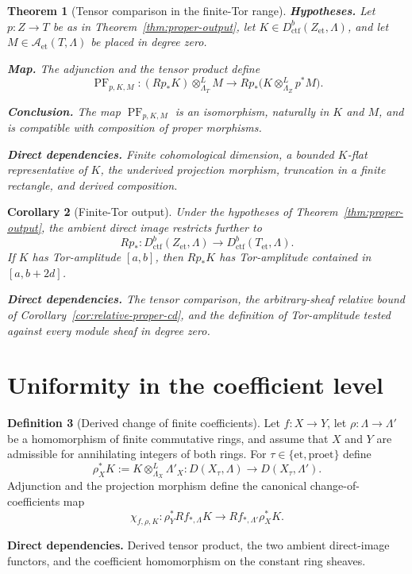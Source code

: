\documentclass[10pt]{article}
\newtheorem{theorem}{Theorem}[section]
\newtheorem{corollary}[theorem]{Corollary}
\theoremstyle{definition}
\newtheorem{definition}[theorem]{Definition}
\newcommand{\Dctf}{D^b_{\mathrm{ctf}}}
\newcommand{\deps}[1]{\par\smallskip\noindent\textbf{Direct dependencies.} #1}
\begin{document}
\begin{theorem}[Tensor comparison in the finite-Tor range]
\label{thm:tensor-comparison}
\textbf{Hypotheses.} Let $p:Z\to T$ be as in
Theorem~\ref{thm:proper-output}, let
$K\in\Dctf(Z_{\mathrm{et}},\Lambda)$, and let
$M\in\mathcal A_{\mathrm{et}}(T,\Lambda)$ be placed in degree zero.

\textbf{Map.} The adjunction and the tensor product define
\[
 \operatorname{PF}_{p,K,M}:
 (Rp_*K)\otimes^L_{\Lambda_T}M
 \longrightarrow
 Rp_*\bigl(K\otimes^L_{\Lambda_Z}p^*M\bigr).
\]

\textbf{Conclusion.} The map $\operatorname{PF}_{p,K,M}$ is an isomorphism,
naturally in $K$ and $M$, and is compatible with composition of proper
morphisms.
\deps{Finite cohomological dimension, a bounded $K$-flat representative of
$K$, the underived projection morphism, truncation in a finite rectangle,
and derived composition.}
\end{theorem}

\begin{corollary}[Finite-Tor output]
\label{cor:ctf-output}
Under the hypotheses of Theorem~\ref{thm:proper-output}, the ambient direct
image restricts further to
\[
 Rp_*:\Dctf(Z_{\mathrm{et}},\Lambda)\longrightarrow
       \Dctf(T_{\mathrm{et}},\Lambda).
\]
If $K$ has Tor-amplitude $[a,b]$, then $Rp_*K$ has Tor-amplitude contained
in $[a,b+2d]$.
\deps{The tensor comparison, the arbitrary-sheaf relative bound of
Corollary~\ref{cor:relative-proper-cd}, and the definition of Tor-amplitude
tested against every module sheaf in degree zero.}
\end{corollary}

\section{Uniformity in the coefficient level}

\begin{definition}[Derived change of finite coefficients]
\label{def:coefficient-change}
Let $f:X\to Y$, let $\rho:\Lambda\to\Lambda'$ be a homomorphism of finite
commutative rings, and assume that $X$ and $Y$ are admissible for annihilating
integers of both rings.  For $\tau\in\{\mathrm{et},\mathrm{proet}\}$ define
\[
 \rho_X^*K:=K\otimes^L_{\Lambda_X}\Lambda'_X:
 D(X_\tau,\Lambda)\longrightarrow D(X_\tau,\Lambda').
\]
Adjunction and the projection morphism define the canonical
change-of-coefficients map
\[
 \chi_{f,\rho,K}:
 \rho_Y^*Rf_{*,\Lambda}K
 \longrightarrow
 Rf_{*,\Lambda'}\rho_X^*K.
\]
\deps{Derived tensor product, the two ambient direct-image functors, and the
coefficient homomorphism on the constant ring sheaves.}
\end{definition}
\end{document}
